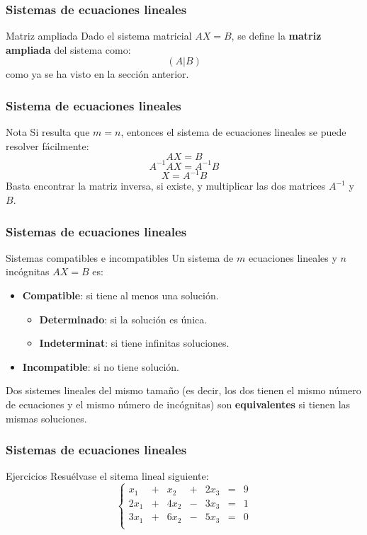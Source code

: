 \documentclass[aspectratio=169]{beamer}
\begin{document}
  
             \begin{frame}
    \frametitle{Sistemas de ecuaciones lineales}
       \begin{block}{Matriz ampliada}
Dado el sistema matricial $AX=B$, se define la \textbf{matriz ampliada} del sistema como: 
\[(A|B)\]
como ya se ha visto en la secci\'on anterior.
\end{block}
  \end{frame} 
  
    
             \begin{frame}
    \frametitle{Sistema de ecuaciones lineales}
       \begin{block}{Nota}
Si resulta que $m=n$, entonces el sistema de ecuaciones lineales se puede resolver f\'acilmente:
\[AX=B\]
\[A^{-1}AX=A^{-1}B\]
\[X=A^{-1}B\]
Basta encontrar la matriz inversa, si existe, y multiplicar las dos matrices $A^{-1}$ y $B$.
\end{block}
  \end{frame} 
  
  
               \begin{frame}
    \frametitle{Sistemas de ecuaciones lineales}
       \begin{block}{Sistemas compatibles e incompatibles}
Un sistema de $m$ ecuaciones lineales y $n$ inc\'ognitas $AX=B$ es:
\begin{itemize}
\item \textbf{Compatible}: si tiene al menos una soluci\'on.
\begin{itemize}
\item \textbf{Determinado}: si la soluci\'on es \'unica.
\item \textbf{Indeterminat}: si tiene infinitas soluciones.
\end{itemize}\item \textbf{Incompatible}: si no tiene soluci\'on.
\end{itemize}
\end{block}
Dos sistemes lineales del mismo tama\~no (es decir, los dos tienen el mismo n\'umero de ecuaciones y el mismo n\'umero de inc\'ognitas) son \textbf{equivalentes} si tienen las mismas soluciones.

  \end{frame} 
  
  
  
    
               \begin{frame}
    \frametitle{Sistemas de ecuaciones lineales}
       \begin{block}{Ejercicios}
Resu\'elvase el sitema lineal siguiente:
\[\left\{\begin{array}{ccccccc}
x_1 & + & x_2 & + & 2x_3 & = & 9\\
2x_1 & + & 4x_2 & - & 3x_3 & = & 1\\
3x_1 & + & 6x_2 & - &  5x_3 & = & 0\\
\end{array}\right.\]
\end{block}
  \end{frame} 
\end{document}
